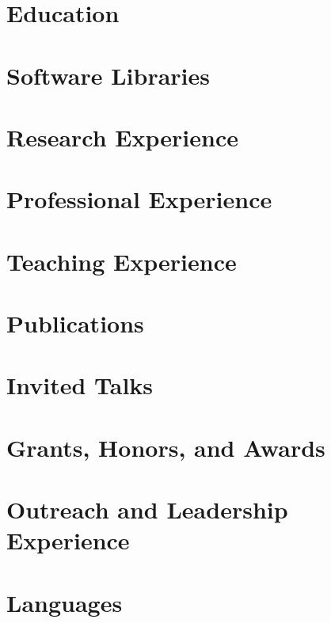 \documentclass[11pt,letterpaper,sans]{moderncv}
\begin{document}
    \makecvtitle

\section{Education}
    
    

\section{Software Libraries}
    

\section{Research Experience}
    
    
    
    
    
    
    

\section{Professional Experience}
    
    
    

\section{Teaching Experience}
    
    
    
    
    
    

\section{Publications}
    
    
    
    
    

\section{Invited Talks}
    

\section{Grants, Honors, and Awards}
    

\section{Outreach and Leadership Experience}
    

\section{Languages}
    

%     
\end{document}
